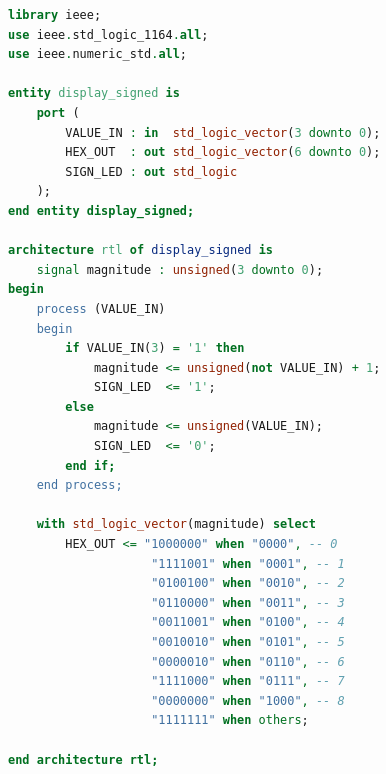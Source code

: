 \documentclass[report, 12pt]{uftreport}
\begin{document}
\begin{lstlisting}[language=VHDL]
library ieee;
use ieee.std_logic_1164.all;
use ieee.numeric_std.all;

entity display_signed is
    port (
        VALUE_IN : in  std_logic_vector(3 downto 0);
        HEX_OUT  : out std_logic_vector(6 downto 0);
        SIGN_LED : out std_logic
    );
end entity display_signed;

architecture rtl of display_signed is
    signal magnitude : unsigned(3 downto 0);
begin
    process (VALUE_IN)
    begin
        if VALUE_IN(3) = '1' then
            magnitude <= unsigned(not VALUE_IN) + 1;
            SIGN_LED  <= '1';
        else
            magnitude <= unsigned(VALUE_IN);
            SIGN_LED  <= '0';
        end if;
    end process;

    with std_logic_vector(magnitude) select
        HEX_OUT <= "1000000" when "0000", -- 0
                    "1111001" when "0001", -- 1
                    "0100100" when "0010", -- 2
                    "0110000" when "0011", -- 3
                    "0011001" when "0100", -- 4
                    "0010010" when "0101", -- 5
                    "0000010" when "0110", -- 6
                    "1111000" when "0111", -- 7
                    "0000000" when "1000", -- 8
                    "1111111" when others;

end architecture rtl;
\end{lstlisting}
\end{document}

